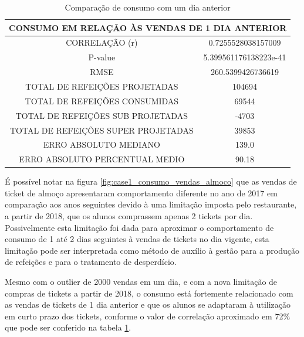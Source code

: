                    \begin{table}[!ht]
                   \centering
                   \caption{Comparação de consumo com um dia anterior}
                     \begin{tabular}{|c|c|}\hline
                        \multicolumn{2}{c}{CONSUMO EM RELAÇÃO ÀS VENDAS DE 1 DIA ANTERIOR}\\ \hline
                            CORRELAÇÃO (r) &  0.7255528038157009\\
                            P-value &5.399561176138223e-41\\
                            RMSE & 260.5399426736619\\
                            TOTAL DE REFEIÇÕES PROJETADAS & 104694\\ 
                            TOTAL DE REFEIÇÕES CONSUMIDAS & 69544\\
                            TOTAL DE REFEIÇÕES SUB PROJETADAS & -4703\\
                            TOTAL DE REFEIÇÕES SUPER PROJETADAS & 39853\\
                            ERRO ABSOLUTO MEDIANO & 139.0\\
                            ERRO ABSOLUTO PERCENTUAL MEDIO & 90.18\\\hline
                    \end{tabular} \label{table:case1_vendas1} \end{table}

        	        É possível notar na figura \ref{fig:case1_consumo_vendas_almoco} que as vendas de ticket de almoço apresentaram comportamento diferente no ano de 2017 em comparação aos anos seguintes devido à uma limitação imposta pelo restaurante, a partir de 2018, que os alunos comprassem apenas 2 tickets por dia. Possivelmente esta limitação foi dada para aproximar o comportamento de consumo de 1 até 2 dias seguintes à vendas de tickets no dia vigente, esta limitação pode ser interpretada como método de auxílio à gestão para a produção de refeições e para o tratamento de desperdício.
            	        
        	        Mesmo com o outlier de 2000 vendas em um dia, e com a nova limitação de compras de tickets a partir de 2018, o consumo está fortemente relacionado com as vendas de tickets de 1 dia anterior e que os alunos se adaptaram à utilização em curto prazo dos tickets, conforme o valor de correlação aproximado em 72\% que pode ser conferido na tabela \ref{table:case1_vendas1}.
        	        
